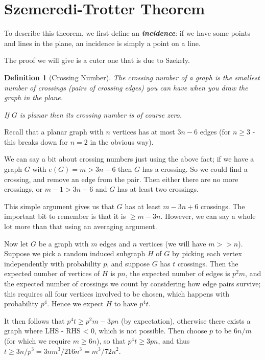 \documentclass[]{article}
\theoremstyle{custhm}
\theoremstyle{cusdef}
\theoremstyle{custhm}
\theoremstyle{custhm}
\theoremstyle{custhm}
\theoremstyle{custhm}
\theoremstyle{cusdef}
\newtheorem*{defin*}{Definition}
\theoremstyle{remark}
\theoremstyle{custhm}
\newcommand{\undf}[1]{\textit{\textbf{#1}}}
\begin{document}

\section{Szemeredi-Trotter Theorem}

To describe this theorem, we first define an \undf{incidence}: if we have some points and lines in the plane, an incidence is simply a point on a line.

The proof we will give is a cuter one that is due to Szekely.

\begin{defin*}[Crossing Number]
The crossing number of a graph is the smallest number of crossings (pairs of crossing edges) you can have when you draw the graph in the plane.

If $G$ is planar then its crossing number is of course zero.
\end{defin*}

Recall that a planar graph with $n$ vertices has at most $3n-6$ edges (for $n\ge 3$ - this breaks down for $n = 2$ in the obvious way).

We can say a bit about crossing numbers just using the above fact; if we have a graph $G$ with $e(G) = m > 3n-6$ then $G$ has a crossing. So we could find a crossing, and remove an edge from the pair. Then either there are no more crossings, or $m - 1 > 3n-6$ and $G$ has at least two crossings.

This simple argument gives us that $G$ has at least $m - 3n + 6$ crossings. The important bit to remember is that it is $\ge m - 3n$. However, we can say a whole lot more than that using an averaging argument.

Now let $G$ be a graph with $m$ edges and $n$ vertices (we will have $m >> n$). Suppose we pick a random induced subgraph $H$ of $G$ by picking each vertex independently with probability $p$, and suppose $G$ has $t$ crossings. Then the expected number of vertices of $H$ is $pn$, the expected number of edges is $p^2 m$, and the expected number of crossings we count by considering how edge pairs survive; this requires all four vertices involved to be chosen, which happens with probability $p^4$. Hence we expect $H$ to have $p^4t$.

It then follows that $p^4t \ge p^2m - 3pn$ (by expectation), otherwise there exists a graph where LHS - RHS < 0, which is not possible. Then choose $p$ to be $6n/m$ (for which we require $m\ge 6n$), so that $p^4t \ge 3pn$, and thus $t \ge 3n/p^3 = 3nm^3/216n^3 = m^3/72n^2$.
\end{document}
